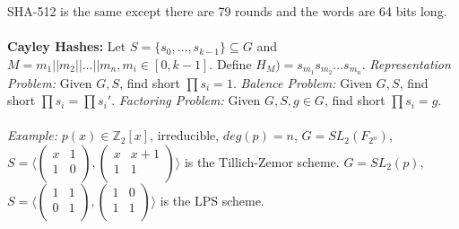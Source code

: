 SHA-512 is the same except there are 79 rounds and the words are 64 bits long.
\\
\\
{\bf Cayley Hashes:} Let $S= \{s_0, \ldots, s_{k-1} \} \subseteq G$ and
$M=m_1 || m_2 || \ldots || m_n, m_i \in [0, k-1]$.  
Define $H_M)= s_{m_1} s_{m_2} \ldots s_{m_n}$.
\emph{Representation Problem:}  Given $G, S$, find short $\prod s_i =1$.
\emph{Balence Problem:}  Given $G, S$, find short $\prod s_i = \prod s_i'$.
\emph{Factoring Problem:}  Given $G, S, g \in G$, find short $\prod s_i = g$.
\\
\\
\emph{Example:} $p(x) \in {\mathbb Z}_2[x]$, irreducible, $deg(p)=n$,
$G=SL_2(F_{2^n})$,  $S= \langle
\left(
\begin{array}{cc}
x & 1 \\
1 & 0 \\
\end{array}
\right),
\left(
\begin{array}{cc}
x & x+1 \\
1 & 1 \\
\end{array}
\right)
\rangle$ is the Tillich-Zemor scheme.
$G=SL_2(p)$,  $S= \langle
\left(
\begin{array}{cc}
1 & 1 \\
0 & 1 \\
\end{array}
\right),
\left(
\begin{array}{cc}
1 & 0 \\
1 & 1 \\
\end{array}
\right)
\rangle$ is the LPS scheme.
